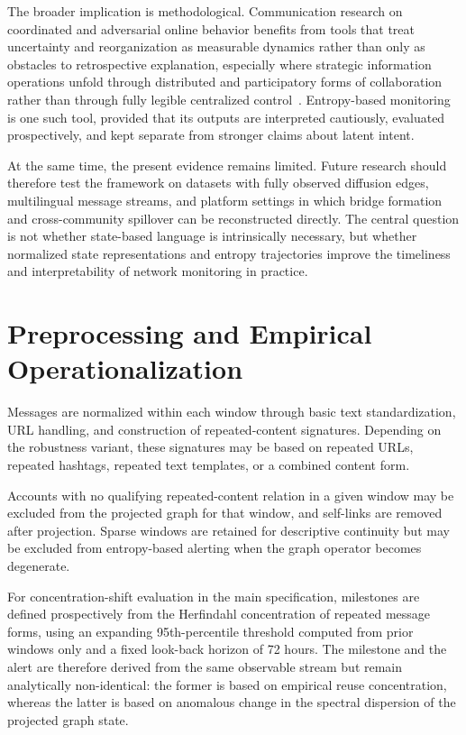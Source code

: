 \documentclass[sigconf]{acmart}
\begin{document}
The broader implication is methodological. Communication research on coordinated and adversarial online behavior benefits from tools that treat uncertainty and reorganization as measurable dynamics rather than only as obstacles to retrospective explanation, especially where strategic information operations unfold through distributed and participatory forms of collaboration rather than through fully legible centralized control~\cite{starbird2019}. Entropy-based monitoring is one such tool, provided that its outputs are interpreted cautiously, evaluated prospectively, and kept separate from stronger claims about latent intent.

At the same time, the present evidence remains limited. Future research should therefore test the framework on datasets with fully observed diffusion edges, multilingual message streams, and platform settings in which bridge formation and cross-community spillover can be reconstructed directly. The central question is not whether state-based language is intrinsically necessary, but whether normalized state representations and entropy trajectories improve the timeliness and interpretability of network monitoring in practice.

\appendix

\section{Preprocessing and Empirical Operationalization}
\label{app:preprocessing}

Messages are normalized within each window through basic text standardization, URL handling, and construction of repeated-content signatures. Depending on the robustness variant, these signatures may be based on repeated URLs, repeated hashtags, repeated text templates, or a combined content form.

Accounts with no qualifying repeated-content relation in a given window may be excluded from the projected graph for that window, and self-links are removed after projection. Sparse windows are retained for descriptive continuity but may be excluded from entropy-based alerting when the graph operator becomes degenerate.

For concentration-shift evaluation in the main specification, milestones are defined prospectively from the Herfindahl concentration of repeated message forms, using an expanding 95th-percentile threshold computed from prior windows only and a fixed look-back horizon of 72 hours. The milestone and the alert are therefore derived from the same observable stream but remain analytically non-identical: the former is based on empirical reuse concentration, whereas the latter is based on anomalous change in the spectral dispersion of the projected graph state.
\end{document}
